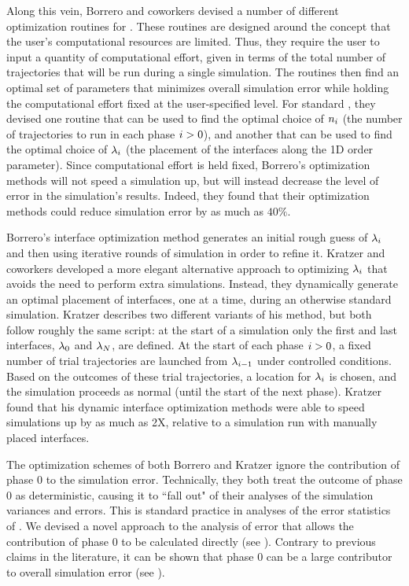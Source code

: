 Along this vein, Borrero and coworkers devised a number of different optimization routines\supercite{Borrero:2008il} for . These routines are designed around the concept that the user's computational resources are limited. Thus, they require the user to input a quantity of computational effort, given in terms of the total number of trajectories that will be run during a single  simulation. The routines then find an optimal set of parameters that minimizes overall simulation error while holding the computational effort fixed at the user-specified level. For standard , they devised one routine that can be used to find the optimal choice of $n_{i}$ (the number of trajectories to run in each phase $i>0$), and another that can be used to find the optimal choice of ${\lambda}_{i}$ (the placement of the interfaces along the 1D order parameter). Since computational effort is held fixed, Borrero's optimization methods will not speed a simulation up, but will instead decrease the level of error in the simulation's results. Indeed, they found that their optimization methods could reduce simulation error by as much as $40\%$.

Borrero's interface optimization method generates an initial rough guess of ${\lambda}_{i}$ and then using iterative rounds of  simulation in order to refine it. Kratzer and coworkers developed a more elegant alternative approach\supercite{Kratzer:2013fs} to optimizing ${\lambda}_{i}$ that avoids the need to perform extra simulations. Instead, they dynamically generate an optimal placement of interfaces, one at a time, during an otherwise standard  simulation. Kratzer describes two different variants of his method, but both follow roughly the same script: at the start of a simulation only the first and last interfaces, ${\lambda}_{0}$ and ${\lambda}_{N}$, are defined. At the start of each phase $i>0$, a fixed number of trial trajectories are launched from ${\lambda}_{i - 1}$ under controlled conditions. Based on the outcomes of these trial trajectories, a location for ${\lambda}_{i}$ is chosen, and the  simulation proceeds as normal (until the start of the next phase). Kratzer found that his dynamic interface optimization methods were able to speed simulations up by as much as 2X, relative to a simulation run with manually placed interfaces.

The optimization schemes of both Borrero and Kratzer ignore the contribution of phase $0$ to the simulation error. Technically, they both treat the outcome of phase $0$ as deterministic, causing it to ``fall out" of their analyses of the simulation variances and errors. This is standard practice\supercite{Allen:2006ch} in analyses of the error statistics of . We devised a novel approach to the analysis of  error that allows the contribution of phase $0$ to be calculated directly (see ). Contrary to previous claims\supercite{Allen:2009kb} in the literature, it can be shown that phase $0$ can be a large contributor to overall simulation error (see ).


